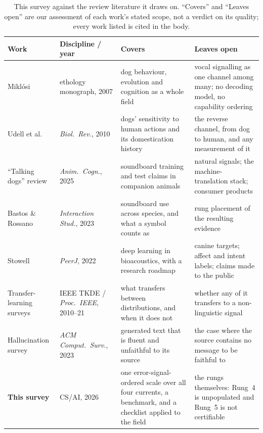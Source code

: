 \begin{table}[htbp]
\centering
\caption{This survey against the review literature it draws on. ``Covers'' and
``Leaves open'' are our assessment of each work's stated scope, not a verdict
on its quality; every work listed is cited in the body.}
\label{tab:position}
\footnotesize
\setlength{\tabcolsep}{4pt}
\begin{tabular}{@{}>{\raggedright\arraybackslash}p{3.5cm}
  >{\raggedright\arraybackslash}p{2.0cm}
  >{\raggedright\arraybackslash}p{4.0cm}
  >{\raggedright\arraybackslash}p{5.3cm}@{}}
\toprule
\textbf{Work} & \textbf{Discipline / year} & \textbf{Covers} & \textbf{Leaves open} \\
\midrule
Miklósi~\cite{miklosi2007dog} & ethology monograph, 2007 & dog behaviour, evolution and cognition as a whole field & vocal signalling as one channel among many; no decoding model, no capability ordering \\
Udell et al.~\cite{udell2010what} & \emph{Biol.\ Rev.}, 2010 & dogs' sensitivity to human actions and its domestication history & the reverse channel, from dog to human, and any measurement of it \\
``Talking dogs'' review~\cite{animalcog2025review} & \emph{Anim.\ Cogn.}, 2025 & soundboard training and test claims in companion animals & natural signals; the machine-translation stack; consumer products \\
Bastos \& Rossano~\cite{bastos2023interact} & \emph{Interaction Stud.}, 2023 & soundboard use across species, and what a symbol counts as & rung placement of the resulting evidence \\
Stowell~\cite{stowell2022review} & \emph{PeerJ}, 2022 & deep learning in bioacoustics, with a research roadmap & canine targets; affect and intent labels; claims made to the public \\
Transfer-learning surveys~\cite{pan2010transfer,zhuang2021transfer} & IEEE TKDE / \emph{Proc.\ IEEE}, 2010--21 & what transfers between distributions, and when it does not & whether any of it transfers to a non-linguistic signal \\
Hallucination survey~\cite{ji2023hallucination} & \emph{ACM Comput.\ Surv.}, 2023 & generated text that is fluent and unfaithful to its source & the case where the source contains no message to be faithful to \\
\midrule
\textbf{This survey} & CS/AI, 2026 & one error-signal-ordered scale over all four currents, a benchmark, and a checklist applied to the field & the rungs themselves: Rung~4 is unpopulated and Rung~5 is not certifiable \\
\bottomrule
\end{tabular}
\end{table}

